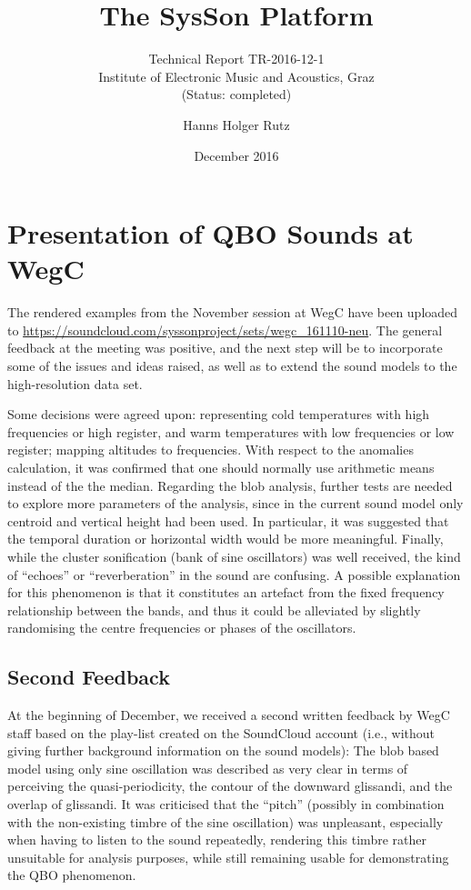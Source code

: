 \documentclass[11pt,a4paper]{article}
\title{The SysSon Platform}
\subtitle{Technical Report TR-2016-12-1\\Institute of Electronic Music and Acoustics, Graz\\(Status: completed)}
\author{Hanns Holger Rutz}
\date{December 2016}
\begin{document}
\maketitle
{}
\thispagestyle{empty}
\newpage
\section{Presentation of QBO Sounds at WegC}

The rendered examples from the November session at WegC have been uploaded to \url{https://soundcloud.com/syssonproject/sets/wegc_161110-neu}. The general feedback at the meeting was positive, and the next step will be to incorporate some of the issues and ideas raised, as well as to extend the sound models to the high-resolution data set.

Some decisions were agreed upon: representing cold temperatures with high frequencies or high register, and warm temperatures with low frequencies or low register; mapping altitudes to frequencies. With respect to the anomalies calculation, it was confirmed that one should normally use arithmetic means instead of the the median. Regarding the blob analysis, further tests are needed to explore more parameters of the analysis, since in the current sound model only centroid and vertical height had been used. In particular, it was suggested that the temporal duration or horizontal width would be more meaningful. Finally, while the cluster sonification (bank of sine oscillators) was well received, the kind of ``echoes'' or ``reverberation'' in the sound are confusing. A possible explanation for this phenomenon is that it constitutes an artefact from the fixed frequency relationship between the bands, and thus it could be alleviated by slightly randomising the centre frequencies or phases of the oscillators.

\subsection*{Second Feedback}

At the beginning of December, we received a second written feedback by WegC staff based on the play-list created on the SoundCloud account (i.e., without giving further background information on the sound models): The blob based model using only sine oscillation was described as very clear in terms of perceiving the quasi-periodicity, the contour of the downward glissandi, and the overlap of glissandi. It was criticised that the ``pitch'' (possibly in combination with the non-existing timbre of the sine oscillation) was unpleasant, especially when having to listen to the sound repeatedly, rendering this timbre rather unsuitable for analysis purposes, while still remaining usable for demonstrating the QBO phenomenon.
\end{document}
